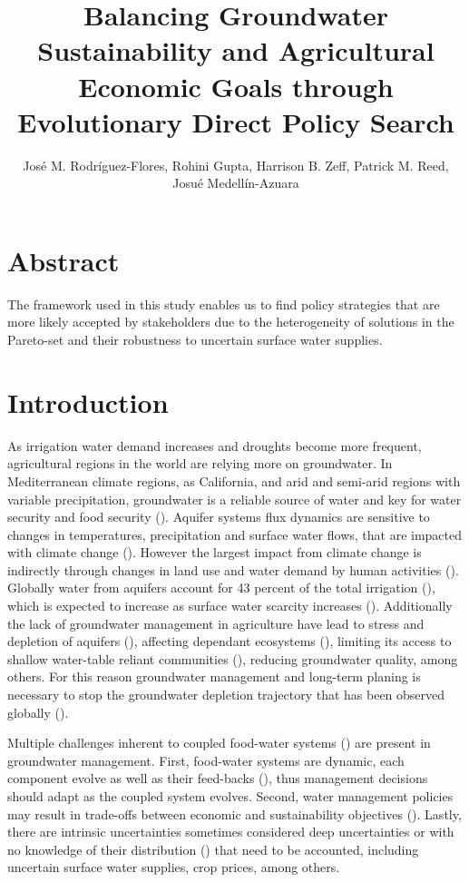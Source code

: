 \documentclass[11pt,a4paper]{article}
\title{Balancing Groundwater Sustainability and Agricultural Economic Goals through Evolutionary Direct Policy Search}
\author{José M. Rodríguez-Flores, Rohini Gupta, Harrison B. Zeff, Patrick M. Reed, Josué Medellín-Azuara}
\date{}
\begin{document}
\maketitle


\section*{Abstract}

The framework used in this study enables us to find policy strategies that are more likely accepted by stakeholders due to the heterogeneity of solutions in the Pareto-set and their robustness to uncertain surface water supplies. 
 
\section{Introduction}

As irrigation water demand increases and droughts become more frequent, agricultural regions in the world are relying more on groundwater. In Mediterranean climate regions, as California, and arid and semi-arid regions with variable precipitation, groundwater is a reliable source of water and key for water security and food security (\cite{priyan_issues_2021,malmgren_groundwater_2022}). Aquifer systems flux dynamics are sensitive to changes in temperatures, precipitation and surface water flows, that are impacted with climate change (\cite{clifton_water_2010,cuthbert_global_2019}). However the largest impact from climate change is indirectly through changes in land use and water demand by human activities (\cite{taylor_ground_2013}). Globally water from aquifers account for 43 percent of the total irrigation (\cite{siebert_groundwater_2010}), which is expected to increase as surface water scarcity increases (\cite{wada_nonsustainable_2012}). Additionally the lack of groundwater management in agriculture have lead to stress and depletion of aquifers (\cite{dalin_groundwater_2017, wada_global_2010}), affecting dependant ecosystems (\cite{bierkens_non-renewable_2019}), limiting its access to shallow water-table reliant communities (\cite{perrone_dry_2017,pauloo_domestic_2020}), reducing groundwater quality, among others. For this reason groundwater management and long-term planing is necessary to stop the groundwater depletion trajectory that has been observed globally (\cite{gorelick_global_2015}).

Multiple challenges inherent to coupled food-water systems (\cite{polhill_modelling_2016}) are present in groundwater management. First, food-water systems are dynamic, each component evolve as well as their feed-backs (\cite{filatova_regime_2016}), thus management decisions should adapt as the coupled system evolves. Second, water management policies may result in trade-offs between economic and sustainability objectives (\cite{mcdermid_minimizing_2021,torhan_tradeoffs_2022,young_hydrologic-economic_2021,stone_economic_2022}). Lastly, there are intrinsic uncertainties sometimes considered deep uncertainties or with no knowledge of their distribution (\cite{stirling_keep_2010}) that need to be accounted, including uncertain surface water supplies, crop prices, among others.  
\end{document}
